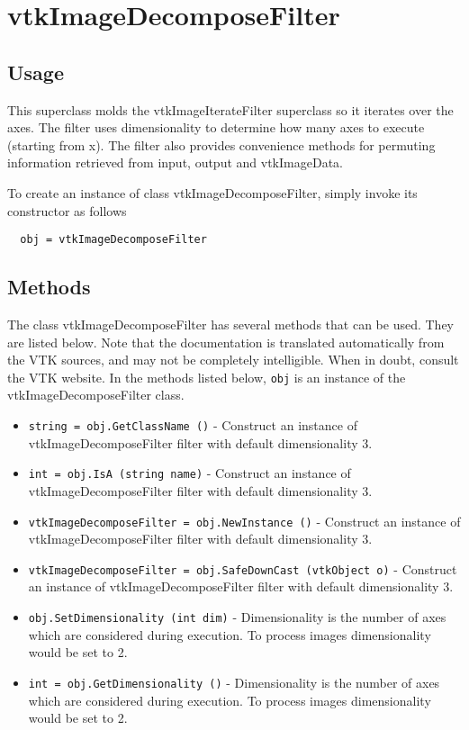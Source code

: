 \section{vtkImageDecomposeFilter}

\subsection{Usage}

 This superclass molds the vtkImageIterateFilter superclass so
 it iterates over the axes.  The filter uses dimensionality to 
 determine how many axes to execute (starting from x).  
 The filter also provides convenience methods for permuting information
 retrieved from input, output and vtkImageData.

To create an instance of class vtkImageDecomposeFilter, simply
invoke its constructor as follows
\begin{verbatim}
  obj = vtkImageDecomposeFilter
\end{verbatim}
\subsection{Methods}

The class vtkImageDecomposeFilter has several methods that can be used.
  They are listed below.
Note that the documentation is translated automatically from the VTK sources,
and may not be completely intelligible.  When in doubt, consult the VTK website.
In the methods listed below, \verb|obj| is an instance of the vtkImageDecomposeFilter class.
\begin{itemize}
\item  \verb|string = obj.GetClassName ()| -  Construct an instance of vtkImageDecomposeFilter filter with default
 dimensionality 3.

\item  \verb|int = obj.IsA (string name)| -  Construct an instance of vtkImageDecomposeFilter filter with default
 dimensionality 3.

\item  \verb|vtkImageDecomposeFilter = obj.NewInstance ()| -  Construct an instance of vtkImageDecomposeFilter filter with default
 dimensionality 3.

\item  \verb|vtkImageDecomposeFilter = obj.SafeDownCast (vtkObject o)| -  Construct an instance of vtkImageDecomposeFilter filter with default
 dimensionality 3.

\item  \verb|obj.SetDimensionality (int dim)| -  Dimensionality is the number of axes which are considered during
 execution. To process images dimensionality would be set to 2.

\item  \verb|int = obj.GetDimensionality ()| -  Dimensionality is the number of axes which are considered during
 execution. To process images dimensionality would be set to 2.

\end{itemize}
